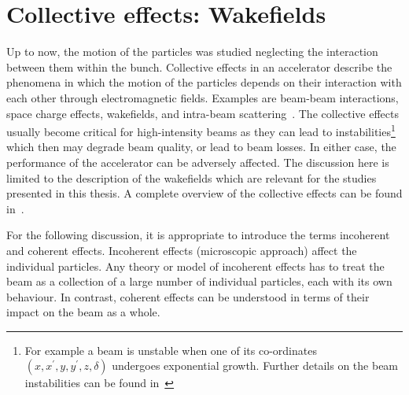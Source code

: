 \section{Collective effects: Wakefields}\label{sec:collective_effects}
Up to now, the motion of the particles was studied neglecting the interaction between them within the bunch. Collective effects in an accelerator describe the phenomena in which the motion of the particles depends on their interaction with each other through electromagnetic fields. Examples are beam-beam interactions, space charge effects, wakefields, and intra-beam scattering~\cite{Zimmermann:2264408}. The collective effects usually become critical for high-intensity beams as they can lead to instabilities\footnote{For example a beam is unstable when one of its co-ordinates $(x, x^\prime, y, y^\prime, z, \delta)$ undergoes exponential growth. Further details on the beam instabilities can be found in~\cite{Rumolo:1982422}} which then may degrade beam quality, or lead to beam losses. In either case, the performance of the accelerator can be adversely affected. The discussion here is limited to the description of the wakefields which are relevant for the studies presented in this thesis. A complete overview of the collective effects can be found in~\cite{wolski2014, Zimmermann:2264408, Chao:collective}.


For the following discussion, it is appropriate to introduce the terms incoherent and coherent effects. Incoherent effects (microscopic approach) affect the individual particles. Any theory or model of incoherent effects has to treat the beam as a collection of a large number of individual particles, each with its own behaviour. In contrast, coherent effects can be understood in terms of their impact on the beam as a whole.%

